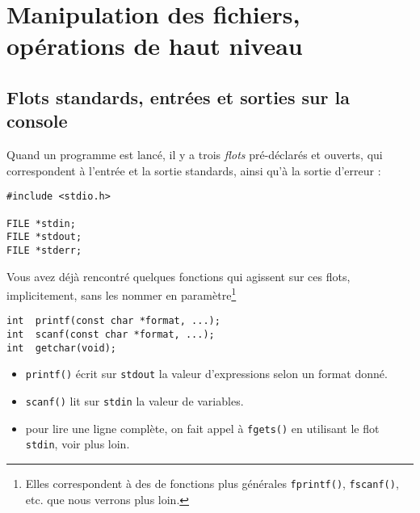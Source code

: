 \section{Manipulation des fichiers, opérations de haut niveau}


\subsection{Flots standards, entrées et sorties sur la console}


Quand un programme est lancé, il y a trois \emph{flots} pré-déclarés et
ouverts, qui correspondent à l'entrée et la sortie standards, ainsi
qu'à la sortie d'erreur :

\extrait
\begin{lstlisting}
#include <stdio.h>

FILE *stdin;
FILE *stdout;
FILE *stderr;
\end{lstlisting}


Vous avez déjà rencontré quelques fonctions qui agissent sur ces
flots, implicitement, sans les nommer en paramètre\footnote{Elles
  correspondent à des de fonctions plus générales \texttt{fprintf()},
  \texttt{fscanf()}, etc.  que nous verrons plus loin.}

\extrait
\begin{lstlisting}
int  printf(const char *format, ...);     
int  scanf(const char *format, ...);      
int  getchar(void);                       
\end{lstlisting}

\begin{itemize}
\item \texttt{printf()} écrit sur \texttt{stdout} la valeur d'expressions
  selon un format donné.
  \item \texttt{scanf()} lit sur \texttt{stdin} la
    valeur de variables.
  \item pour lire une ligne complète, on fait appel à \texttt{fgets()} en
    utilisant le flot \texttt{stdin}, voir plus loin. 
\end{itemize}


\source



